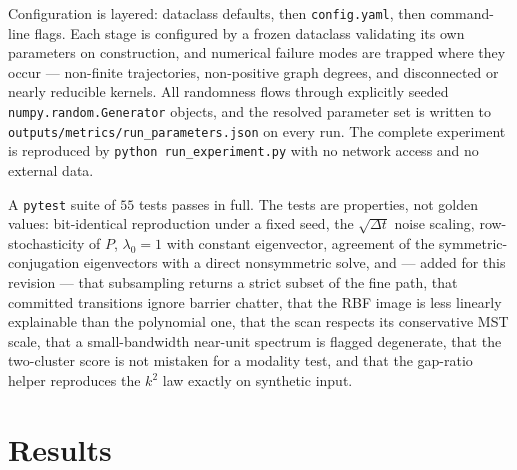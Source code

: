 \documentclass[11pt]{article}
\begin{document}
Configuration is layered: dataclass defaults, then \texttt{config.yaml}, then
command-line flags. Each stage is configured by a frozen dataclass validating its
own parameters on construction, and numerical failure modes are trapped where
they occur --- non-finite trajectories, non-positive graph degrees, and
disconnected or nearly reducible kernels. All randomness flows through explicitly seeded
\texttt{numpy.random.Generator} objects, and the resolved parameter set is written
to \texttt{outputs/metrics/run\_parameters.json} on every run. The complete
experiment is reproduced by \texttt{python run\_experiment.py} with no network
access and no external data.

A \texttt{pytest} suite of $55$ tests passes in full. The
tests are properties, not golden values: bit-identical reproduction under a fixed
seed, the $\sqrt{\Delta t}$ noise scaling, row-stochasticity of $P$,
$\lambda_0 = 1$ with constant eigenvector, agreement of the symmetric-conjugation
eigenvectors with a direct nonsymmetric solve, and --- added for this revision ---
that subsampling returns a strict subset of the fine path, that committed
transitions ignore barrier chatter, that the RBF image is less linearly
explainable than the polynomial one, that the scan respects its conservative MST
scale, that a small-bandwidth near-unit spectrum is flagged degenerate, that the
two-cluster score is not mistaken for a modality test, and that the gap-ratio
helper reproduces the $k^2$ law exactly on synthetic input.

\section{Results}
\label{sec:results}
\end{document}
